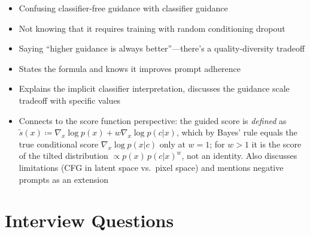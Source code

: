\begin{interviewq}
\redflags
\begin{itemize}
    \item Confusing classifier-free guidance with classifier guidance
    \item Not knowing that it requires training with random conditioning dropout
    \item Saying ``higher guidance is always better''---there's a quality-diversity tradeoff
\end{itemize}


\goodgreat
\begin{itemize}
    \item {} States the formula and knows it improves prompt adherence
    \item {} Explains the implicit classifier interpretation, discusses the guidance scale tradeoff with specific values
    \item {} Connects to the score function perspective: the guided score is \textit{defined} as $\tilde{s}(x) \coloneqq \nabla_x \log p(x) + w \nabla_x \log p(c|x)$, which by Bayes' rule equals the true conditional score $\nabla_x \log p(x|c)$ only at $w = 1$; for $w > 1$ it is the score of the tilted distribution $\propto p(x)\,p(c|x)^w$, not an identity. Also discusses limitations (CFG in latent space vs.\ pixel space) and mentions negative prompts as an extension
\end{itemize}

\end{interviewq}

\section{Interview Questions}
\label{sec:gen_interview}

